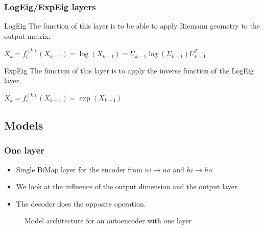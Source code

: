\documentclass{beamer}
\begin{document}
\begin{frame}
\frametitle{LogEig/ExpEig layers}

\begin{block}{LogEig}
    The function of this layer is to be able to apply Riemann geometry to the output matrix.
\end{block}

\begin{center}
    $ X_k = f_l^{(k)}(X_{k-1})=\log (X_{k-1})=U_{k-1}\log(\Sigma_{k-1})U_{k-1}^T$
\end{center}

\begin{block}{ExpEig}
    The function of this layer is to apply the inverse function of the LogEig layer.
\end{block}

\begin{center}
    $ X_k = f_e^{(k)}(X_{k-1})=\exp (X_{k-1})$
\end{center}

\end{frame}
\subsection{Models}
\begin{frame}
\frametitle{One layer}
\begin{itemize}
    \item Single BiMap layer for the encoder from $ni\rightarrow no$ and $hi\rightarrow ho$.
    \item We look at the influence of the output dimension and the output layer.
    \item The decoder does the opposite operation.
\end{itemize}
\begin{figure}
    \centering
    {\tiny
    
    \caption{Model architecture for an autoencoder with one layer}
    }
\end{figure}

\end{frame}
\end{document}
